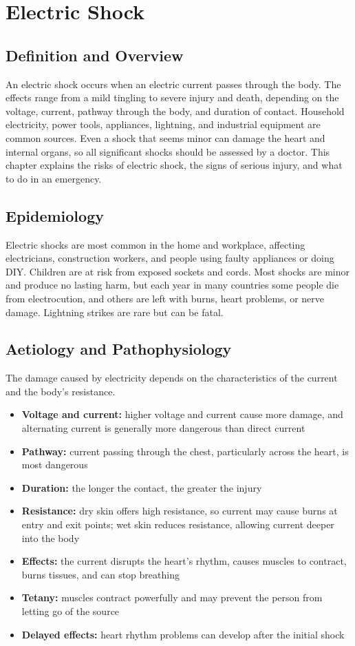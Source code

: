 \chapter{Electric Shock}

\section*{Definition and Overview}
An electric shock occurs when an electric current passes through the body. The effects range from a mild tingling to severe injury and death, depending on the voltage, current, pathway through the body, and duration of contact. Household electricity, power tools, appliances, lightning, and industrial equipment are common sources. Even a shock that seems minor can damage the heart and internal organs, so all significant shocks should be assessed by a doctor. This chapter explains the risks of electric shock, the signs of serious injury, and what to do in an emergency.

\section*{Epidemiology}
Electric shocks are most common in the home and workplace, affecting electricians, construction workers, and people using faulty appliances or doing DIY. Children are at risk from exposed sockets and cords. Most shocks are minor and produce no lasting harm, but each year in many countries some people die from electrocution, and others are left with burns, heart problems, or nerve damage. Lightning strikes are rare but can be fatal.

\section*{Aetiology and Pathophysiology}
The damage caused by electricity depends on the characteristics of the current and the body's resistance.
\begin{itemize}
    \item \textbf{Voltage and current:} higher voltage and current cause more damage, and alternating current is generally more dangerous than direct current
    \item \textbf{Pathway:} current passing through the chest, particularly across the heart, is most dangerous
    \item \textbf{Duration:} the longer the contact, the greater the injury
    \item \textbf{Resistance:} dry skin offers high resistance, so current may cause burns at entry and exit points; wet skin reduces resistance, allowing current deeper into the body
    \item \textbf{Effects:} the current disrupts the heart's rhythm, causes muscles to contract, burns tissues, and can stop breathing
    \item \textbf{Tetany:} muscles contract powerfully and may prevent the person from letting go of the source
    \item \textbf{Delayed effects:} heart rhythm problems can develop after the initial shock
\end{itemize}

